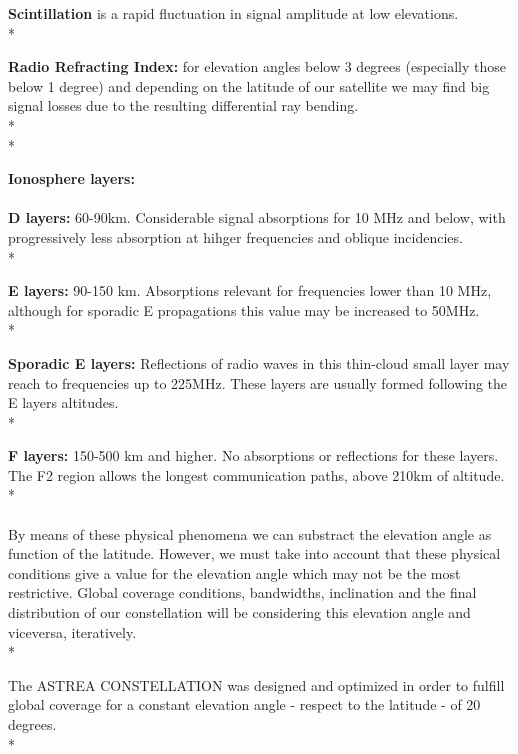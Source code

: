 \textendash\textbf{ Scintillation } is a rapid fluctuation in signal amplitude at low elevations. \\*

\textendash\textbf{ Radio Refracting Index: } for elevation angles below 3 degrees (especially those below 1 degree) and depending on the latitude of our satellite we may find big signal losses due to the resulting differential ray bending.\\*\\*


\textendash\textbf{ Ionosphere layers: }
\paragraph{  }

\textbf{D layers:} 60-90km. Considerable signal absorptions for 10 MHz and below, with progressively less absorption at hihger frequencies and oblique incidencies.\\*

\textbf{E layers:} 90-150 km. Absorptions relevant for frequencies lower than 10 MHz, although for sporadic E propagations this value may be increased to 50MHz.  \\*

\textbf{Sporadic E layers:} Reflections of radio waves in this thin-cloud small layer may reach to frequencies up to 225MHz. These layers are usually formed following the E layers altitudes. \\*

\textbf{F layers:} 150-500 km and higher. No absorptions or reflections for these layers. The F2 region allows the longest communication paths, above 210km of altitude. \\* 

\paragraph{}

By means of these physical phenomena we can substract the elevation angle as function of the latitude. However, we must take into account that these physical conditions give a value for the elevation angle which may not be the most restrictive. Global coverage conditions, bandwidths, inclination and the final distribution of our constellation will be considering this elevation angle and viceversa, iteratively. \\*

The ASTREA CONSTELLATION was designed and optimized in order to fulfill global coverage for a constant elevation angle - respect to the latitude - of 20 degrees.\\* 

